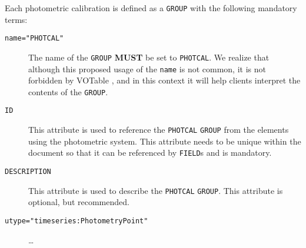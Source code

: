 \documentclass[11pt,a4paper]{ivoa}
\let\fg=\color
\def\attr#1{{\tt{\fg{DarkRed}#1}}}
\def\elem#1{{\tt{\fg{DarkRed}#1}}}
\def\attrval#1#2{{\tt{\fg{DarkRed}#1}="{\fg{DarkPurple}#2}"}}
\begin{document}
Each photometric calibration is defined as a \elem{GROUP} with the following mandatory terms:
\begin{description}
     \item[\attrval{name}{PHOTCAL}] The name of the \elem{GROUP} \textbf{MUST} be set to \verb|PHOTCAL|. We realize that although this proposed usage of the \attr{name} is not common, it is not forbidden by VOTable \cite[][see Section 3.2]{std:VOTABLE1.4}, and in this context it will help clients interpret the contents of the \elem{GROUP}. 
     \item[\attr{ID}] This attribute is used to reference the \texttt{PHOTCAL} \elem{GROUP} from the elements using the photometric system. This attribute needs to be unique within the document so that it can be referenced by \elem{FIELD}s and is mandatory.
     \item[\attr{DESCRIPTION}] This attribute is used to describe the \texttt{PHOTCAL} \elem{GROUP}. This attribute is optional, but recommended.
     \item[\attrval{utype}{timeseries:PhotometryPoint}] \dots
\end{description}
\end{document}
